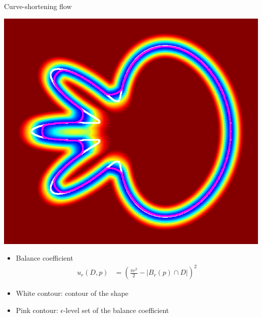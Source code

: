 \begin{frame}
\end{frame}

\begin{frame}
{Curve-shortening flow}
\begin{minipage}{0.5\textwidth}
\center
\includegraphics[scale=0.2]{figures/curve-shortening-flow/balance-coefficient-zero-level-set.png}
\end{minipage}
\begin{minipage}{0.49\textwidth}
\footnotesize
\begin{itemize}
\item{Balance coefficient}
\begin{align*}
u_r(D,p) &= \left( \frac{\pi r^2}{2} - |B_r(p) \cap D| \right)^2
\end{align*}
\item{White contour: contour of the shape}
\item{Pink contour: $\epsilon$-level set of the balance coefficient}
\end{itemize}
\end{minipage}
\end{frame}


